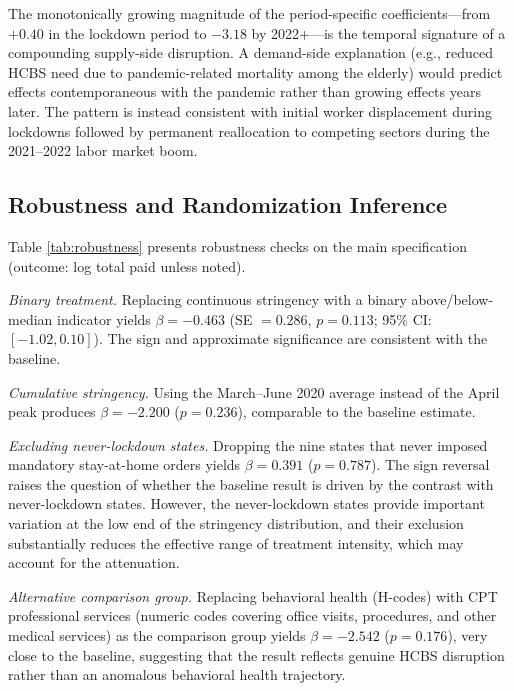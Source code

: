 \documentclass[12pt]{article}
\begin{document}
The monotonically growing magnitude of the period-specific coefficients---from $+0.40$ in the lockdown period to $-3.18$ by 2022+---is the temporal signature of a compounding supply-side disruption. A demand-side explanation (e.g., reduced HCBS need due to pandemic-related mortality among the elderly) would predict effects contemporaneous with the pandemic rather than growing effects years later. The pattern is instead consistent with initial worker displacement during lockdowns followed by permanent reallocation to competing sectors during the 2021--2022 labor market boom.

\subsection{Robustness and Randomization Inference}



Table \ref{tab:robustness} presents robustness checks on the main specification (outcome: log total paid unless noted).

\textit{Binary treatment.} Replacing continuous stringency with a binary above/below-median indicator yields $\beta = -0.463$ (SE $= 0.286$, $p = 0.113$; 95\% CI: $[-1.02, 0.10]$). The sign and approximate significance are consistent with the baseline.

\textit{Cumulative stringency.} Using the March--June 2020 average instead of the April peak produces $\beta = -2.200$ ($p = 0.236$), comparable to the baseline estimate.

\textit{Excluding never-lockdown states.} Dropping the nine states that never imposed mandatory stay-at-home orders yields $\beta = 0.391$ ($p = 0.787$). The sign reversal raises the question of whether the baseline result is driven by the contrast with never-lockdown states. However, the never-lockdown states provide important variation at the low end of the stringency distribution, and their exclusion substantially reduces the effective range of treatment intensity, which may account for the attenuation.

\textit{Alternative comparison group.} Replacing behavioral health (H-codes) with CPT professional services (numeric codes covering office visits, procedures, and other medical services) as the comparison group yields $\beta = -2.542$ ($p = 0.176$), very close to the baseline, suggesting that the result reflects genuine HCBS disruption rather than an anomalous behavioral health trajectory.
\end{document}
